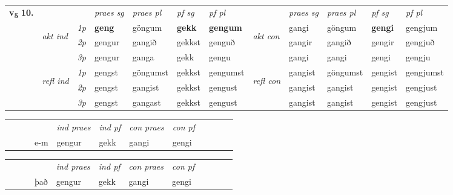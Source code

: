 \begin{tabular}{llllllllllll} \toprule
\multirow{4}{*}{{{\textbf{v{\textsubscript{5}}} \Large{\textbf{10.}}}}}  & &   &  \textit{praes sg}  & \textit{praes pl}  &\textit{ pf sg} & \textit{pf pl} &  &  \textit{praes sg}  & \textit{praes pl}  & \textit{pf sg} & \textit{pf pl } \\*
	\cmidrule{4-7} \cmidrule{9-12}
 & \multirow{3}{*}{\begin{turn}{90}\textit{akt ind}\end{turn}} & {\textit{1p}} & \textbf{geng} & göngum    & \textbf{gekk} & \textbf{gengum} & \multirow{3}{*}{\begin{turn}{90}\textit{akt con}\end{turn}} &gangi & göngum & \textbf{gengi} & gengjum\\*
& &  {\textit{2p}} &  gengur  & gangið   & gekkst & genguð & & gangir & gangið & gengir & gengjuð \\*
& &  {\textit{3p}} & gengur & ganga   & gekk & gengu & & gangi & gangi& gengi & gengju  \\*
\cmidrule{4-7} \cmidrule{9-12}
 &\multirow{3}{*}{\begin{turn}{90}\textit{refl ind}\end{turn}} & {\textit{1p}} & gengst & göngumst    & gekkst & gengumst & \multirow{3}{*}{\begin{turn}{90}\textit{refl con}\end{turn}}  &gangist & göngumst & gengist & gengjumst\\*
 &&  {\textit{2p}} &  gengst  & gangist   & gekkst & gengust & &gangist & gangist & gengist & gengjust \\*
& &  {\textit{3p}} & gengst & gangast   & gekkst & gengust & & gangist & gangist& gengist & gengjust  \\*
\cmidrule{4-7} \cmidrule{9-12}
\end{tabular}


\begin{tabular}{llllllllllll}
 & &  & &  \textit{ind praes} & \textit{ind pf} & \textit{con praes} & \textit{con pf} \\*
&  & & e-m & gengur & gekk & gangi & gengi \\*
\cmidrule{5-9}
\end{tabular}


\begin{tabular}{llllllllllll}
 & &  & &  \textit{ind praes} & \textit{ind pf} & \textit{con praes} & \textit{con pf} \\*
&  & & það & gengur & gekk & gangi & gengi \\*
\cmidrule{5-9}
\end{tabular}


